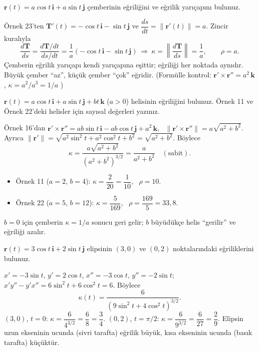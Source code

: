 \begin{soru}
$\mathbf r(t)=a\cos t\,\mathbf i+a\sin t\,\mathbf j$ çemberinin eğriliğini ve eğrilik yarıçapını bulunuz.
\end{soru}
\begin{cevap}
Örnek 23'ten $\mathbf T'(t)=-\cos t\,\mathbf i-\sin t\,\mathbf j$ ve $\dfrac{ds}{dt}=\|\mathbf r'(t)\|=a$. Zincir kuralıyla
\[ \frac{d\mathbf T}{ds}=\frac{d\mathbf T/dt}{ds/dt}=\frac1a(-\cos t\,\mathbf i-\sin t\,\mathbf j)\ \Rightarrow\ \kappa=\left\|\frac{d\mathbf T}{ds}\right\|=\frac1a,\qquad \boxed{\rho=a} . \]
Çemberin eğrilik yarıçapı kendi yarıçapına eşittir; eğriliği her noktada aynıdır. Büyük çember ``az'', küçük çember ``çok'' eğridir.
(Formülle kontrol: $\mathbf r'\times\mathbf r''=a^2\,\mathbf k$, $\kappa=a^2/a^3=1/a$ \checkmark)
\end{cevap}

\begin{soru}
$\mathbf r(t)=a\cos t\,\mathbf i+a\sin t\,\mathbf j+bt\,\mathbf k$ ($a>0$) helisinin eğriliğini bulunuz. Örnek 11 ve Örnek 22'deki
helisler için sayısal değerleri yazınız.
\end{soru}
\begin{cevap}
Örnek 16'dan $\mathbf r'\times\mathbf r''=ab\sin t\,\mathbf i-ab\cos t\,\mathbf j+a^2\,\mathbf k$, \ $\|\mathbf r'\times\mathbf r''\|=a\sqrt{a^2+b^2}$.
Ayrıca $\|\mathbf r'\|=\sqrt{a^2\sin^2t+a^2\cos^2t+b^2}=\sqrt{a^2+b^2}$. Böylece
\[ \kappa=\frac{a\sqrt{a^2+b^2}}{(a^2+b^2)^{3/2}}=\frac{a}{a^2+b^2}\quad(\text{sabit}). \]
\begin{itemize}
\item Örnek 11 ($a=2$, $b=4$): $\kappa=\dfrac{2}{20}=\dfrac1{10}$, \ $\rho=10$.
\item Örnek 22 ($a=5$, $b=12$): $\kappa=\dfrac{5}{169}$, \ $\rho=\dfrac{169}{5}=33{,}8$.
\end{itemize}
$b=0$ için çemberin $\kappa=1/a$ sonucu geri gelir; $b$ büyüdükçe helis ``gerilir'' ve eğriliği azalır.
\end{cevap}

\begin{soru}
$\mathbf r(t)=3\cos t\,\mathbf i+2\sin t\,\mathbf j$ elipsinin $(3,0)$ ve $(0,2)$ noktalarındaki eğriliklerini bulunuz.
\end{soru}
\begin{cevap}
$x'=-3\sin t$, $y'=2\cos t$, $x''=-3\cos t$, $y''=-2\sin t$; \ $x'y''-y'x''=6\sin^2t+6\cos^2t=6$. Böylece
\[ \kappa(t)=\frac{6}{(9\sin^2t+4\cos^2t)^{3/2}} . \]
$(3,0)$, $t=0$: $\kappa=\dfrac{6}{4^{3/2}}=\dfrac68=\dfrac34$. \quad $(0,2)$, $t=\pi/2$: $\kappa=\dfrac{6}{9^{3/2}}=\dfrac{6}{27}=\dfrac29$.
Elipsin uzun ekseninin ucunda (sivri tarafta) eğrilik büyük, kısa ekseninin ucunda (basık tarafta) küçüktür.
\end{cevap}

